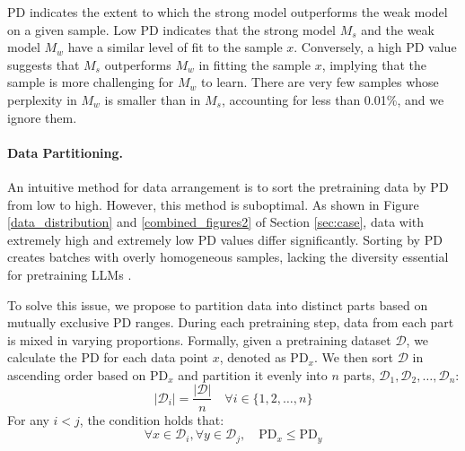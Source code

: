 \documentclass[11pt]{article}
\begin{document}
PD indicates the extent to which the strong model outperforms the weak model on a given sample. Low PD indicates that the strong model \( M_s \) and the weak model \( M_w \) have a similar level of fit to the sample \( x \). Conversely, a high PD value suggests that \( M_s \) outperforms \( M_w \) in fitting the sample \( x \), implying that the sample is more challenging for \( M_w \) to learn. There are very few samples whose perplexity in \(M_w\) is smaller than in \(M_s\), accounting for less than 0.01\%, and we ignore them.

\paragraph{Data Partitioning.} An intuitive method for data arrangement is to sort the pretraining data by PD from low to high. However, this method is suboptimal. As shown in Figure \ref{data_distribution} and \ref{combined_figures2} of Section \ref{sec:case}, data with extremely high and extremely low PD values differ significantly. Sorting by PD creates batches with overly homogeneous samples, lacking the diversity essential for pretraining LLMs \cite{sachdeva2024train}. 

To solve this issue, we propose to partition data into distinct parts based on mutually exclusive PD ranges. 
During each pretraining step, data from each part is mixed in varying proportions. Formally, given a pretraining dataset \(\mathcal{D}\), we calculate the PD for each data point \(x\), denoted as \(\text{PD}_x\). We then sort \(\mathcal{D}\) in ascending order based on \(\text{PD}_x\) and partition it evenly into \(n\) parts, \(\mathcal{D}_1, \mathcal{D}_2, \ldots, \mathcal{D}_n\): 
\begin{equation}
   |\mathcal{D}_i| = \frac{|\mathcal{D}|}{n} \quad \forall i \in \{1, 2, \ldots, n\}
\end{equation}
For any \(i < j\), the condition holds that:
\begin{equation}
    \forall x \in \mathcal{D}_i, \forall y \in \mathcal{D}_j, \quad \text{PD}_x \leq \text{PD}_y
\end{equation}
\end{document}

